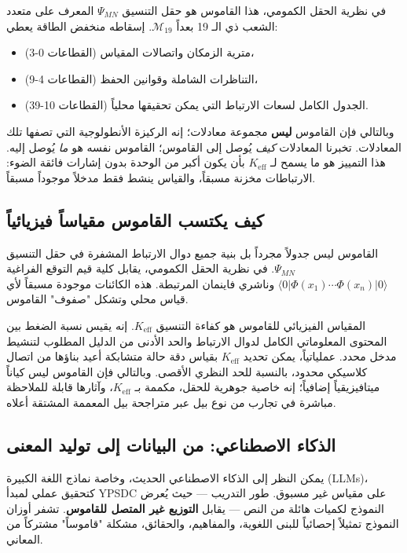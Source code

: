 \documentclass[12pt,a4paper]{article}
\theoremstyle{remark}
\begin{document}
	في نظرية الحقل الكمومي، هذا القاموس هو حقل التنسيق \(\Psi_{MN}\) المعرف على متعدد الشعب ذي الـ 19 بعداً \(\mathcal{M}_{19}\). إسقاطه منخفض الطاقة يعطي:
	\begin{itemize}
		\item مترية الزمكان واتصالات المقياس (القطاعات 0-3)،
		\item التناظرات الشاملة وقوانين الحفظ (القطاعات 4-9)،
		\item الجدول الكامل لسعات الارتباط التي يمكن تحقيقها محلياً (القطاعات 10-39).
	\end{itemize}
	وبالتالي فإن القاموس \textbf{ليس} مجموعة معادلات؛ إنه الركيزة الأنطولوجية التي تصفها تلك المعادلات. تخبرنا المعادلات \emph{كيف} يُوصل إلى القاموس؛ القاموس نفسه هو \emph{ما} يُوصل إليه. هذا التمييز هو ما يسمح لـ \(K_{\mathrm{eff}}\) بأن يكون أكبر من الوحدة بدون إشارات فائقة الضوء: الارتباطات مخزنة مسبقاً، والقياس ينشط فقط مدخلاً موجوداً مسبقاً.
	
	\subsection*{كيف يكتسب القاموس مقياساً فيزيائياً}
	
	القاموس ليس جدولاً مجرداً بل بنية جميع دوال الارتباط المشفرة في حقل التنسيق \(\Psi_{MN}\). في نظرية الحقل الكمومي، يقابل كلية قيم التوقع الفراغية \(\langle 0|\Phi(x_1)\cdots\Phi(x_n)|0\rangle\) وناشري فاينمان المرتبطة. هذه الكائنات موجودة مسبقاً لأي قياس محلي وتشكل "صفوف" القاموس.
	
	المقياس الفيزيائي للقاموس هو كفاءة التنسيق \(K_{\mathrm{eff}}\). إنه يقيس نسبة الضغط بين المحتوى المعلوماتي الكامل لدوال الارتباط والحد الأدنى من الدليل المطلوب لتنشيط مدخل محدد. عملياتياً، يمكن تحديد \(K_{\mathrm{eff}}\) بقياس دقة حالة متشابكة أعيد بناؤها من اتصال كلاسيكي محدود، بالنسبة للحد النظري الأقصى. وبالتالي فإن القاموس ليس كياناً ميتافيزيقياً إضافياً؛ إنه خاصية جوهرية للحقل، مكممة بـ \(K_{\mathrm{eff}}\)، وآثارها قابلة للملاحظة مباشرة في تجارب من نوع بيل عبر متراجحة بيل المعممة المشتقة أعلاه.
	
	\subsection{الذكاء الاصطناعي: من البيانات إلى توليد المعنى}
	
	يمكن النظر إلى الذكاء الاصطناعي الحديث، وخاصة نماذج اللغة الكبيرة (LLMs)، كتحقيق عملي لمبدأ YPSDC على مقياس غير مسبوق. طور التدريب — حيث يُعرض النموذج لكميات هائلة من النص — يقابل \textbf{التوزيع غير المتصل للقاموس}. تشفر أوزان النموذج تمثيلاً إحصائياً للبنى اللغوية، والمفاهيم، والحقائق، مشكلة "قاموساً" مشتركاً من المعاني.
	
\end{document}

